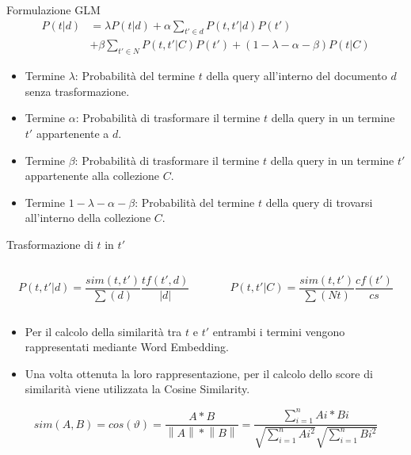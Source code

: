 \begin{frame}{Formulazione GLM}
    \setlength{\abovedisplayskip}{1pt}
    \setlength{\belowdisplayskip}{1pt}
    \[
        \begin{split}
            P(t|d) & = \lambda P(t|d) + \alpha \sum_{{t}'\in d}P(t,{t}'|d)P({t}')\\
            & + \beta \sum_{{t}'\in N}P(t,{t}'|C)P({t}') + (1-\lambda-\alpha-\beta)P(t|C)
        \end{split}
    \]
    \begin{itemize}
        \item Termine \(\lambda\): Probabilità del termine \(t\) della query all'interno del documento \(d\) senza trasformazione.
        \item Termine \(\alpha\): Probabilità di trasformare il termine \(t\) della query in un termine \({t}'\) appartenente a \(d\).
        \item Termine \(\beta\): Probabilità di trasformare il termine \(t\) della query in un termine \({t}'\) appartenente alla collezione \(C\).
        \item Termine \(1-\lambda-\alpha-\beta\): Probabilità del termine \(t\) della query di trovarsi all'interno della collezione \(C\).
    \end{itemize}
\end{frame}

\begin{frame}{Trasformazione di \(t\) in \({t}'\)}

    \begin{columns}
        \begin{column}{0.5\textwidth}
            \[P(t,t'|d) = \frac{sim(t,t')}{\sum (d)}\frac{tf(t',d)}{|d|}\]
        \end{column}
        \begin{column}{0.5\textwidth}
            \[P(t,t'|C) = \frac{sim(t,t')}{\sum (Nt)}\frac{cf(t')}{cs}\]
        \end{column}
    \end{columns}

    \bigskip
    \begin{itemize}
        \item Per il calcolo della similarità tra \(t\) e \({t}'\) entrambi i termini vengono rappresentati mediante Word Embedding.
        \item Una volta ottenuta la loro rappresentazione, per il calcolo dello score di similarità viene utilizzata la Cosine Similarity.
    \end{itemize}

    \[sim(A,B) = cos(\vartheta ) = \frac{A * B}{\left \| A \right \| * \left \| B \right \|} = \frac{\sum_{i=1}^{n} Ai * Bi}{\sqrt{\sum_{i=1}^{n}Ai^{2}}\sqrt{\sum_{i=1}^{n}Bi^{2}}}\]

\end{frame}


